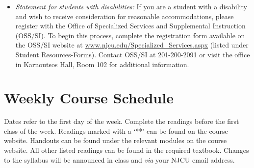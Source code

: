 \documentclass[article,oneside]{memoir}
\begin{document}
\begin{itemize}
\item \textit{Statement for students with disabilities:} If you are a student
with a disability and wish to receive consideration for reasonable
accommodations, please register with the Office of Specialized Services
and Supplemental Instruction (OSS/SI). To begin this process, complete
the registration form available on the OSS/SI website at
\href{http://www.njcu.edu/Specialized_Services.aspx}{www.njcu.edu/Specialized\_Services.aspx}
(listed under Student Resources-Forms). Contact OSS/SI at 201-200-2091
or visit the office in Karnoutsos Hall, Room 102 for additional
information.

\end{itemize}



\section{Weekly Course Schedule}
Dates refer to the first day of the week. Complete the readings before the first class of the week. Readings marked with a `**' can be found on the course website. Handouts can be found under the relevant modules on the course website. All other listed readings can be found in the required textbook. Changes to the syllabus will be announced in class and \emph{via} your NJCU email address.
\end{document}
